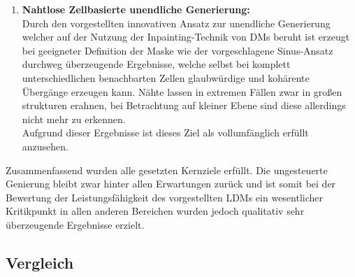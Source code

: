 \begin{enumerate}
    \item \textbf {Nahtlose Zellbasierte unendliche Generierung:} \\
    Durch den vorgestellten innovativen Ansatz zur unendliche Generierung welcher auf der Nutzung der Inpainting-Technik von DMs beruht ist erzeugt bei geeigneter Definition der Maske wie der vorgeschlagene Sinus-Ansatz durchweg überzeugende Ergebnisse, welche selbst bei komplett unterschiedlichen benachbarten Zellen glaubwürdige und kohärente Übergänge erzeugen kann. Nähte lassen in extremen Fällen zwar in großen strukturen erahnen, bei Betrachtung auf kleiner Ebene sind diese allerdings nicht mehr zu erkennen. \\
    Aufgrund dieser Ergebnisse ist dieses Ziel als vollumfänglich erfüllt anzusehen.     

\end{enumerate}
Zusammenfassend wurden alle gesetzten Kernziele erfüllt. Die ungesteuerte Genierung bleibt zwar hinter allen Erwartungen zurück und ist somit bei der Bewertung der Leistungsfähigkeit des vorgestellten LDMs ein wesentlicher Kritikpunkt in allen anderen Bereichen wurden jedoch qualitativ sehr überzeugende Ergebnisse erzielt. 
 
\subsection{Vergleich}

